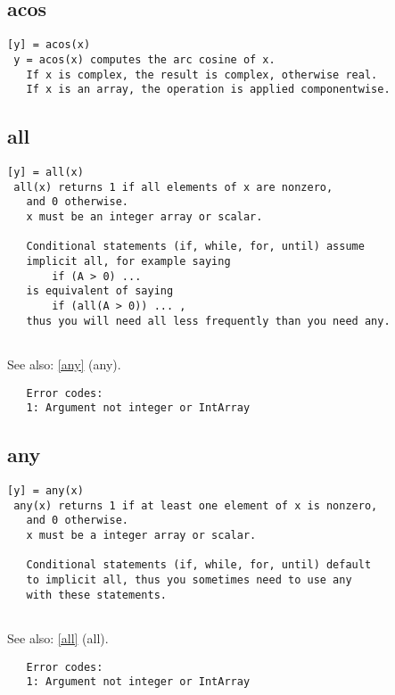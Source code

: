 \documentclass[a4paper]{article}
\begin{document}
\subsection{acos\label{acos}}

\begin{tscreen}
\begin{verbatim}
[y] = acos(x)
 y = acos(x) computes the arc cosine of x.
   If x is complex, the result is complex, otherwise real.
   If x is an array, the operation is applied componentwise.
\end{verbatim}
\end{tscreen}



\subsection{all\label{all}}

\begin{tscreen}
\begin{verbatim}
[y] = all(x)
 all(x) returns 1 if all elements of x are nonzero,
   and 0 otherwise.
   x must be an integer array or scalar.

   Conditional statements (if, while, for, until) assume
   implicit all, for example saying
       if (A > 0) ...
   is equivalent of saying
       if (all(A > 0)) ... ,
   thus you will need all less frequently than you need any.
   
\end{verbatim}

See also: \ref{any} {(any)}.
\begin{verbatim}
   Error codes:
   1: Argument not integer or IntArray 
\end{verbatim}
\end{tscreen}



\subsection{any\label{any}}

\begin{tscreen}
\begin{verbatim}
[y] = any(x)
 any(x) returns 1 if at least one element of x is nonzero,
   and 0 otherwise.
   x must be a integer array or scalar.

   Conditional statements (if, while, for, until) default
   to implicit all, thus you sometimes need to use any
   with these statements.
   
\end{verbatim}

See also: \ref{all} {(all)}.
\begin{verbatim}
   Error codes:
   1: Argument not integer or IntArray 
\end{verbatim}
\end{tscreen}
\end{document}
